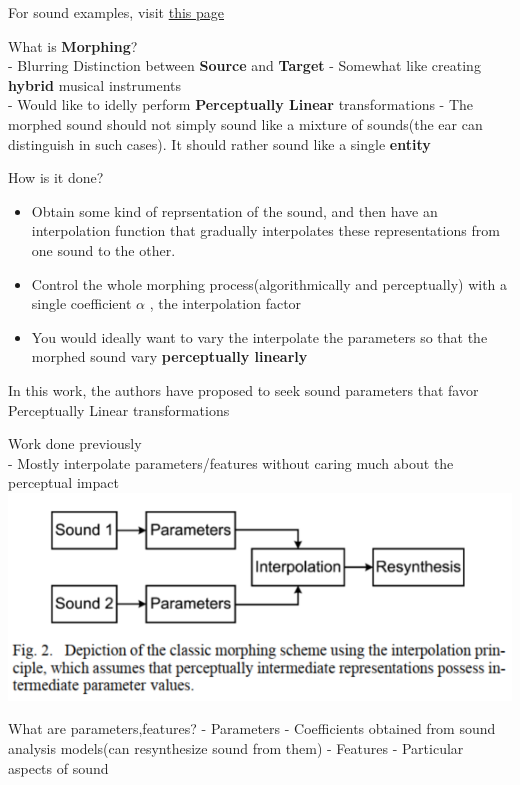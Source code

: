 \documentclass[11pt]{article}
\makeatletter
\def\maxwidth{\ifdim\Gin@nat@width>\linewidth\linewidth
    \else\Gin@nat@width\fi}
\let\Oldincludegraphics\includegraphics
\renewcommand{\includegraphics}[1]{\Oldincludegraphics[width=.8\maxwidth]{#1}}
\providecommand{\tightlist}{%
      \setlength{\itemsep}{0pt}\setlength{\parskip}{0pt}}
\makeatother
\begin{document}
For sound examples, visit
\href{http://recherche.ircam.fr/anasyn/caetano/overview.html}{this page}

    What is \textbf{Morphing}?\\
- Blurring Distinction between \textbf{Source} and \textbf{Target} -
Somewhat like creating \textbf{hybrid} musical instruments\\
- Would like to idelly perform \textbf{Perceptually Linear}
transformations - The morphed sound should not simply sound like a
mixture of sounds(the ear can distinguish in such cases). It should
rather sound like a single \textbf{entity}

How is it done?

\begin{itemize}
\tightlist
\item
  Obtain some kind of reprsentation of the sound, and then have an
  interpolation function that gradually interpolates these
  representations from one sound to the other.\\
\item
  Control the whole morphing process(algorithmically and perceptually)
  with a single coefficient \(\alpha\) , the interpolation factor
\item
  You would ideally want to vary the interpolate the parameters so that
  the morphed sound vary \textbf{perceptually linearly}
\end{itemize}

In this work, the authors have proposed to seek sound parameters that
favor Perceptually Linear transformations

    Work done previously\\
- Mostly interpolate parameters/features without caring much about the
perceptual impact \includegraphics{fig_9.PNG}

What are parameters,features? - Parameters - Coefficients obtained from
sound analysis models(can resynthesize sound from them) - Features -
Particular aspects of sound
\end{document}
